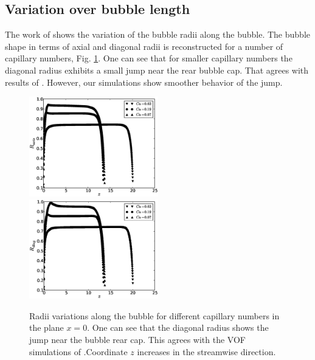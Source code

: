 \documentclass[preprint,12pt]{elsarticle}
\begin{document}
\subsection{Variation over bubble length}
The work of \citet{wang-non-circular} shows the variation of the bubble
radii along the
bubble. The bubble shape in terms of axial and diagonal radii is reconstructed for a number of
capillary numbers, Fig. \ref{fig:bubble:variation:capillaries}. One can see that for smaller
capillary numbers the diagonal radius exhibits a small jump near the rear bubble cap. That agrees
with results of \citet{wang-non-circular}. However, our simulations show smoother behavior of
the jump.  
\begin{figure}[ht]
\includegraphics[width=0.5\textwidth]{Figures/bubble_rad_axis.eps}
\includegraphics[width=0.5\textwidth]{Figures/bubble_rad_diag.eps}\\
\caption{Radii variations along the bubble for different capillary numbers in the plane $x=0$.
One can see that the diagonal radius shows the jump near the bubble rear cap. This agrees with the
VOF simulations of \citet{wang-non-circular}.Coordinate $z$ increases in the streamwise direction.
\label{fig:bubble:variation:capillaries}}
\end{figure}
\end{document}
